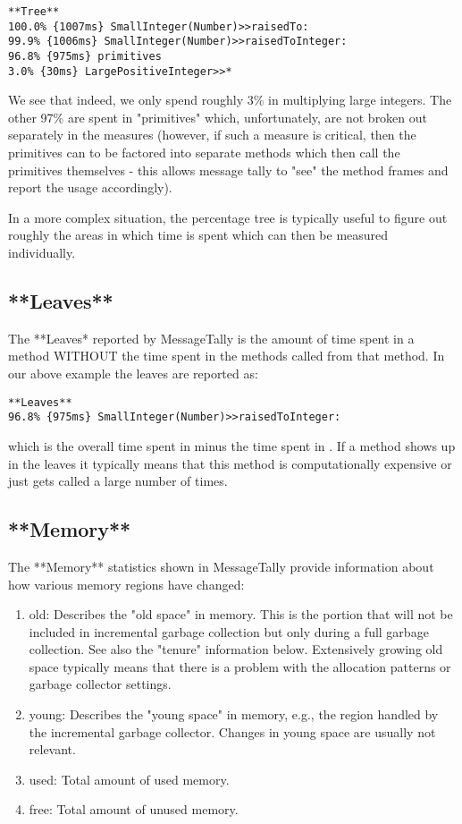 \documentclass[a4paper,10pt,twoside]{book}
\begin{document}
\begin{verbatim}
**Tree**
100.0% {1007ms} SmallInteger(Number)>>raisedTo:
99.9% {1006ms} SmallInteger(Number)>>raisedToInteger:
96.8% {975ms} primitives
3.0% {30ms} LargePositiveInteger>>*
\end{verbatim}

We see that indeed, we only spend roughly 3\% in multiplying large
integers. The other 97\% are spent in "primitives" which, unfortunately,
are not broken out separately in the measures (however, if such a
measure is critical, then the primitives can to be factored into
separate methods which then call the primitives themselves - this allows
message tally to "see" the method frames and report the usage accordingly).

In a more complex situation, the percentage tree is typically useful to
figure out roughly the areas in which time is spent which can then be
measured individually.

 \subsection{**Leaves**}


The **Leaves* reported by MessageTally is the amount of time spent in a
method WITHOUT the time spent in the methods called from that method. In
our above example the leaves are reported as:

\begin{verbatim}
**Leaves**
96.8% {975ms} SmallInteger(Number)>>raisedToInteger:
\end{verbatim}

which is the overall time spent in 
minus the time spent in . If a method
shows up in the leaves it typically means that this method is
computationally expensive or just gets called a large number of times.

 \subsection{**Memory**}


The **Memory** statistics shown in MessageTally provide information
about how various memory regions have changed:

\begin{enumerate}
\item old: Describes the "old space" in memory. This is the portion that
will not be included in incremental garbage collection but only during a
full garbage collection. See also the "tenure" information below.
Extensively growing old space typically means that there is a problem
with the allocation patterns or garbage collector settings.

\item young: Describes the "young space" in memory, e.g., the region handled
by the incremental garbage collector. Changes in young space are usually
not relevant.

\item used: Total amount of used memory.

\item free: Total amount of unused memory.
\end{enumerate}
\end{document}
